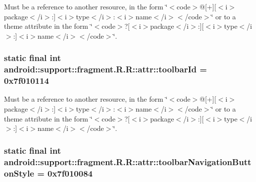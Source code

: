 Must be a reference to another resource, in the form \char`\"{}$<$code$>$@\mbox{[}+\mbox{]}\mbox{[}$<$i$>$package$<$/i$>$:\mbox{]}$<$i$>$type$<$/i$>$:$<$i$>$name$<$/i$>$$<$/code$>$\char`\"{} or to a theme attribute in the form \char`\"{}$<$code$>$?\mbox{[}$<$i$>$package$<$/i$>$:\mbox{]}\mbox{[}$<$i$>$type$<$/i$>$:\mbox{]}$<$i$>$name$<$/i$>$$<$/code$>$\char`\"{}. \hypertarget{classandroid_1_1support_1_1fragment_1_1_r_1_1attr_e3a0995cf206582680bb6f7d6807b590}{
\subsubsection[{toolbarId}]{\setlength{\rightskip}{0pt plus 5cm}static final int android::support::fragment.R.R::attr::toolbarId = 0x7f010114}}
\label{classandroid_1_1support_1_1fragment_1_1_r_1_1attr_e3a0995cf206582680bb6f7d6807b590}


Must be a reference to another resource, in the form \char`\"{}$<$code$>$@\mbox{[}+\mbox{]}\mbox{[}$<$i$>$package$<$/i$>$:\mbox{]}$<$i$>$type$<$/i$>$:$<$i$>$name$<$/i$>$$<$/code$>$\char`\"{} or to a theme attribute in the form \char`\"{}$<$code$>$?\mbox{[}$<$i$>$package$<$/i$>$:\mbox{]}\mbox{[}$<$i$>$type$<$/i$>$:\mbox{]}$<$i$>$name$<$/i$>$$<$/code$>$\char`\"{}. \hypertarget{classandroid_1_1support_1_1fragment_1_1_r_1_1attr_95af52e36f48eef0d248ddd52c2db99e}{
\subsubsection[{toolbarNavigationButtonStyle}]{\setlength{\rightskip}{0pt plus 5cm}static final int android::support::fragment.R.R::attr::toolbarNavigationButtonStyle = 0x7f010084}}
\label{classandroid_1_1support_1_1fragment_1_1_r_1_1attr_95af52e36f48eef0d248ddd52c2db99e}


